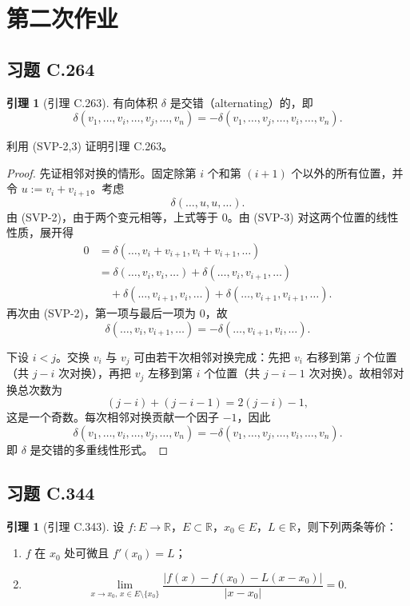 \documentclass[11pt,a4paper]{article}
\newcommand{\R}{\mathbb{R}}
\theoremstyle{definition}
\newtheorem{lemma}[theorem]{引理}
\begin{document}
\section{第二次作业}

\subsection{习题 C.264}

\begin{lemma}[引理 C.263]
  有向体积 $\delta$ 是交错（alternating）的，即
  \[
    \delta(v_1, \dots, v_i, \dots, v_j, \dots, v_n)
    = -\delta(v_1, \dots, v_j, \dots, v_i, \dots, v_n).
  \]
\end{lemma}

利用 (SVP-2,3) 证明引理 C.263。

\begin{proof}
先证相邻对换的情形。固定除第 $i$ 个和第 $(i+1)$ 个以外的所有位置，并令 $u := v_i + v_{i+1}$。考虑
\[
  \delta(\dots, u, u, \dots).
\]
由 (SVP-2)，由于两个变元相等，上式等于 $0$。由 (SVP-3) 对这两个位置的线性性质，展开得
\[
  \begin{aligned}
    0
    &= \delta(\dots, v_i+v_{i+1}, v_i+v_{i+1}, \dots) \\
    &= \delta(\dots, v_i, v_i, \dots)
    + \delta(\dots, v_i, v_{i+1}, \dots) \\
    &\quad + \delta(\dots, v_{i+1}, v_i, \dots)
    + \delta(\dots, v_{i+1}, v_{i+1}, \dots).
  \end{aligned}
\]
再次由 (SVP-2)，第一项与最后一项为 $0$，故
\[
  \delta(\dots, v_i, v_{i+1}, \dots)
  = -\delta(\dots, v_{i+1}, v_i, \dots).
\]

下设 $i<j$。交换 $v_i$ 与 $v_j$ 可由若干次相邻对换完成：先把 $v_i$ 右移到第 $j$ 个位置（共 $j-i$ 次对换），再把 $v_j$ 左移到第 $i$ 个位置（共 $j-i-1$ 次对换）。故相邻对换总次数为
\[
  (j-i)+(j-i-1)=2(j-i)-1,
\]
这是一个奇数。每次相邻对换贡献一个因子 $-1$，因此
\[
  \delta(v_1,\dots,v_i,\dots,v_j,\dots,v_n)
  = -\delta(v_1,\dots,v_j,\dots,v_i,\dots,v_n).
\]
即 $\delta$ 是交错的多重线性形式。
\end{proof}

\subsection{习题 C.344}

\begin{lemma}[引理 C.343]
  设 $f : E \to \R$，$E \subset \R$，$x_0 \in E$，$L \in \R$，则下列两条等价：
  \begin{enumerate}
    \item $f$ 在 $x_0$ 处可微且 $f'(x_0)=L$；
    \item
      \[
        \lim_{x\to x_0,\,x\in E\setminus\{x_0\}}
        \frac{|f(x)-f(x_0)-L(x-x_0)|}{|x-x_0|}=0.
      \]
  \end{enumerate}
\end{lemma}
\end{document}
